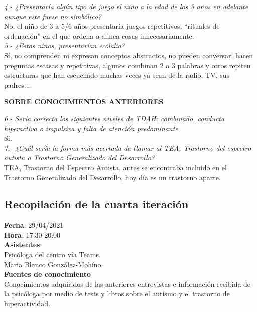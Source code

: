 \documentclass[letterpaper,12pt]{article}
\begin{document}
\textit{4.- ¿Presentaría algún tipo de juego el niño a la edad de los 3 años en adelante aunque este fuese no simbólico?}\\

No, el niño de 3 a 5/6 años presentaría juegos repetitivos, ``rituales de ordenación'' en el que ordena o alinea cosas innecesariamente. \\

\textit{5.- ¿Estos niños, presentarían ecolalia?}\\

Sí, no comprenden ni expresan conceptos abstractos, no pueden conversar, hacen preguntas escasas y repetitivas, algunos combinan 2 o 3 palabras y otros repiten estructuras que han escuchado muchas veces ya sean de la radio, TV, sus padres...

\begin{flushleft}
\textbf{SOBRE CONOCIMIENTOS ANTERIORES}
\end{flushleft}
\textit{6.- Sería correcta los siguientes niveles de TDAH: combinado, conducta hiperactiva o impulsiva y falta de atención predominante} \\

Si.\\

\textit{7.- ¿Cuál sería la forma más acertada de llamar al TEA, Trastorno del espectro autista o Trastorno Generalizado del Desarrollo?} \\

TEA, Trastorno del Espectro Autista, antes se encontraba incluido en el Trastorno Generalizado del Desarrollo, hoy día es un trastorno aparte.

\subsection{Recopilación de la cuarta iteración}

\textbf{Fecha}: 29/04/2021 \\
\textbf{Hora}: 17:30-20:00 \\
\textbf{Asistentes}: \\
Psicóloga del centro vía Teams.\\
Maria Blanco González-Mohíno. \\

\textbf{Fuentes de conocimiento} \\
Conocimientos adquiridos de las anteriores entrevistas e información recibida de la psicóloga por medio de tests y libros sobre el autismo y el trastorno de hiperactividad. \\
\end{document}
